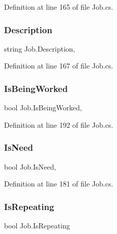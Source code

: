 Definition at line 165 of file Job.\+cs.

\mbox{\label{class_job_afeda12f81081285a25b0b14196ea5dfd}} 
\subsubsection{\texorpdfstring{Description}{Description}}
{\footnotesize\ttfamily string Job.\+Description\hspace{0.3cm}{\ttfamily [get]}, {\ttfamily [set]}}



Definition at line 167 of file Job.\+cs.

\mbox{\label{class_job_a176a9fc1578ec68148bbddfc46434fe9}} 
\subsubsection{\texorpdfstring{Is\+Being\+Worked}{IsBeingWorked}}
{\footnotesize\ttfamily bool Job.\+Is\+Being\+Worked\hspace{0.3cm}{\ttfamily [get]}, {\ttfamily [set]}}



Definition at line 192 of file Job.\+cs.

\mbox{\label{class_job_afab3bbba6fbbf4a8982f8ae4a52642da}} 
\subsubsection{\texorpdfstring{Is\+Need}{IsNeed}}
{\footnotesize\ttfamily bool Job.\+Is\+Need\hspace{0.3cm}{\ttfamily [get]}, {}}



Definition at line 181 of file Job.\+cs.

\mbox{\label{class_job_acccc269a1a1a79bbc4bdd8f1c2bd2e2e}} 
\subsubsection{\texorpdfstring{Is\+Repeating}{IsRepeating}}
{\footnotesize\ttfamily bool Job.\+Is\+Repeating\hspace{0.3cm}{\ttfamily [get]}}



